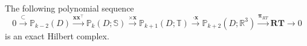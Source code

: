 \begin{lemma}\label{lem:Koszul}
The following polynomial sequence
\begin{equation}\label{eq:divdivKoszulcomplex3dPoly}
0\xrightarrow{\subset}\mathbb P_{k-2}(D) \xrightarrow{\boldsymbol x\boldsymbol x^{\intercal}} \mathbb P_k(D; \mathbb S) \xrightarrow{\times\boldsymbol x} \mathbb P_{k+1}(D; \mathbb T)\xrightarrow{\cdot\boldsymbol x} \mathbb P_{k+2}(D; \mathbb R^3)\xrightarrow{\boldsymbol \pi_{RT}}\boldsymbol{RT}\xrightarrow{}0
\end{equation}
is an exact Hilbert complex.
\end{lemma}
